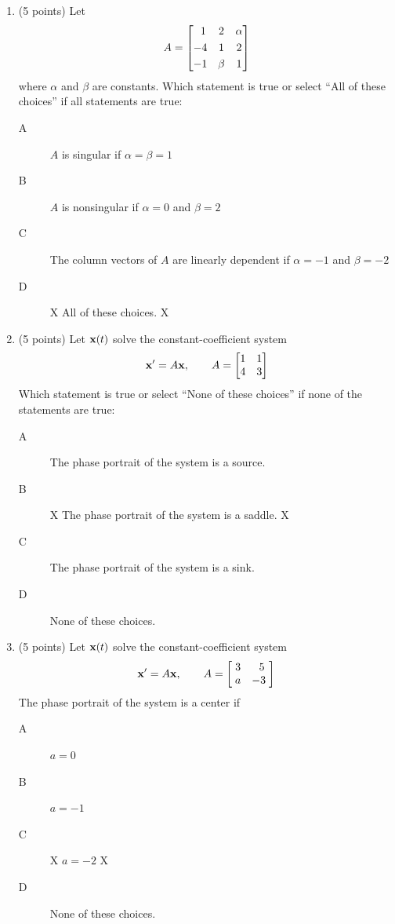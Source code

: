 \documentclass{article}
\begin{document}
\begin{enumerate}
\item (5 points) Let
\[
A=\begin{bmatrix}\;\;1&2&\alpha\smallskip\\ -4&1&2\smallskip\\ -1&\beta&1\end{bmatrix}
\]
where $\alpha$ and $\beta$ are constants.  Which statement is true or select ``All of these choices'' if all statements are true:
\begin{description}
\item[A]  $A$ is singular if $\alpha=\beta=1$
\item[B]  $A$ is nonsingular if $\alpha=0$ and $\beta=2$
\item[C]  The column vectors of $A$ are linearly dependent if $\alpha=-1$ and $\beta=-2$
\item[D]  X All of these choices. X
\end{description}

\bigskip
\item (5 points)  Let ${\bf x}(t)$ solve the constant-coefficient system
\[
{\bf x}\sp\prime=A{\bf x},\qquad A=\begin{bmatrix}1&1\\ 4&3\end{bmatrix}
\]
Which statement is true or select ``None of these choices'' if none of the statements are true:
\begin{description}
\item[A] The phase portrait of the system is a source.
\item[B] X The phase portrait of the system is a saddle. X
\item[C] The phase portrait of the system is a sink.
\item[D] None of these choices.
\end{description}

\bigskip
\item (5 points) Let ${\bf x}(t)$ solve the constant-coefficient system
\[
{\bf x}\sp\prime=A{\bf x},\qquad A=\begin{bmatrix}\;3&\;\;5\;\\ \;a&-3\;\end{bmatrix}
\]
The phase portrait of the system is a center if
\begin{description}
\item[A]  $a=0$
\item[B]  $a=-1$
\item[C]  X $a=-2$ X
\item[D]  None of these choices.
\end{description}


\end{enumerate}
\end{document}
